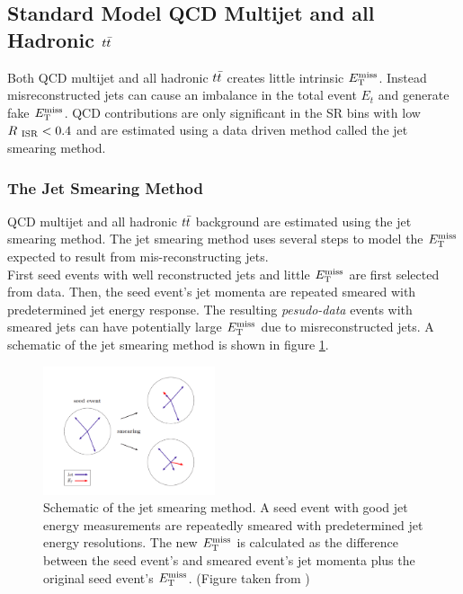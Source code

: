 \subsection{Standard Model QCD Multijet and all Hadronic $t\bar{t}$}
\label{sec:Bkg:QCD}

\indent Both QCD multijet and all hadronic $t\bar{t}$ creates little intrinsic $E_{\mathrm{T}}^{\mathrm{miss}}$. Instead misreconstructed jets can cause an imbalance in the total event $E_t$ and generate fake $E_{\mathrm{T}}^{\mathrm{miss}}$.  QCD contributions are only significant in the SR bins with low $R_{~\mathrm{ISR}} < 0.4$ and are estimated using a data driven method called the jet smearing method.  \\

\subsubsection*{The Jet Smearing Method}

\indent QCD multijet and all hadronic $t\bar{t}$ background are estimated using the jet smearing method.  The jet smearing method uses several steps to model the $E_{\mathrm{T}}^{\mathrm{miss}}$ expected to result from mis-reconstructing jets.  \\

\indent First seed events with well reconstructed jets and little $E_{\mathrm{T}}^{\mathrm{miss}}$ are first selected from data. Then, the seed event's jet momenta are repeated smeared with predetermined jet energy response.  The resulting {\it pesudo-data} events with smeared jets can have potentially large $E_{\mathrm{T}}^{\mathrm{miss}}$ due to misreconstructed jets.  A schematic of the jet smearing method is shown in figure \ref{fig:jetsmearing}.\\

\begin{figure}[htbp]
\begin{center}
\includegraphics[width=0.45\textwidth]{figures/QCDJetSmearing/jet_smearing.pdf}
\end{center}
\caption{Schematic of the jet smearing method.  A seed event with good jet energy measurements are repeatedly smeared with predetermined jet energy resolutions.  The new $E_{\mathrm{T}}^{\mathrm{miss}}$ is calculated as the difference between the seed event's and smeared event's jet momenta plus the original seed event's $E_{\mathrm{T}}^{\mathrm{miss}}$.  (Figure taken from \cite{JetSmearing})}
\label{fig:jetsmearing}
\end{figure}

